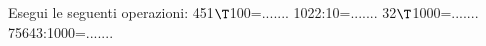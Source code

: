 \item Esegui le seguenti operazioni: 451$\T$100=....... 1022:10=....... 32$\T$1000=....... 75643:1000=....... 
